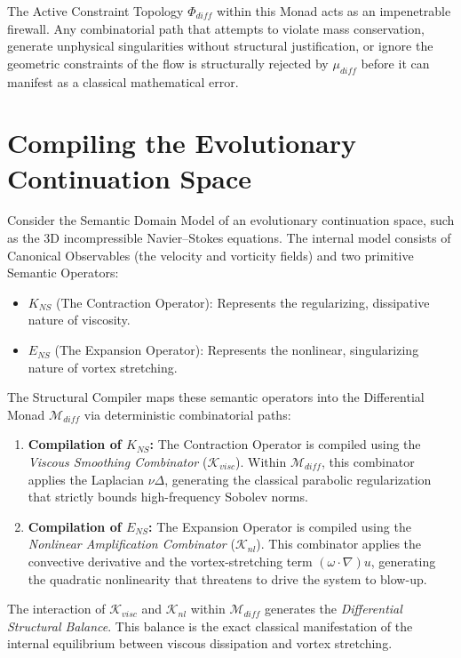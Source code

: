 \documentclass[12pt,openany]{extbook}
\theoremstyle{plain}
\theoremstyle{definition}
\begin{document}
The Active Constraint Topology $\Phi_{diff}$ within this Monad acts as an impenetrable firewall. Any combinatorial path that attempts to violate mass conservation, generate unphysical singularities without structural justification, or ignore the geometric constraints of the flow is structurally rejected by $\mu_{diff}$ before it can manifest as a classical mathematical error.

\section{Compiling the Evolutionary Continuation Space}

Consider the Semantic Domain Model of an evolutionary continuation space, such as the 3D incompressible Navier--Stokes equations. The internal model consists of Canonical Observables (the velocity and vorticity fields) and two primitive Semantic Operators:
\begin{itemize}
    \item $K_{NS}$ (The Contraction Operator): Represents the regularizing, dissipative nature of viscosity.
    \item $E_{NS}$ (The Expansion Operator): Represents the nonlinear, singularizing nature of vortex stretching.
\end{itemize}

The Structural Compiler maps these semantic operators into the Differential Monad $\mathcal{M}_{diff}$ via deterministic combinatorial paths:

\begin{enumerate}
    \item \textbf{Compilation of $K_{NS}$:} The Contraction Operator is compiled using the \emph{Viscous Smoothing Combinator} ($\mathcal{K}_{visc}$). Within $\mathcal{M}_{diff}$, this combinator applies the Laplacian $\nu \Delta$, generating the classical parabolic regularization that strictly bounds high-frequency Sobolev norms.
    \item \textbf{Compilation of $E_{NS}$:} The Expansion Operator is compiled using the \emph{Nonlinear Amplification Combinator} ($\mathcal{K}_{nl}$). This combinator applies the convective derivative and the vortex-stretching term $(\omega \cdot \nabla)u$, generating the quadratic nonlinearity that threatens to drive the system to blow-up.
\end{enumerate}

The interaction of $\mathcal{K}_{visc}$ and $\mathcal{K}_{nl}$ within $\mathcal{M}_{diff}$ generates the \emph{Differential Structural Balance}. This balance is the exact classical manifestation of the internal equilibrium between viscous dissipation and vortex stretching.
\end{document}
